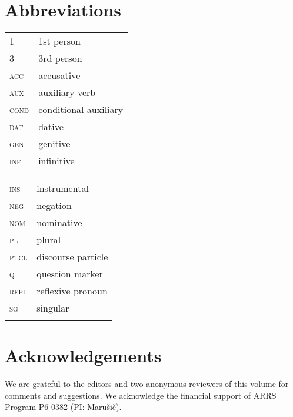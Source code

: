 \documentclass[output=paper,
modfonts,
newtxmath,
hidelinks
]{langscibook}
\begin{document}
\section*{Abbreviations}
\begin{tabularx}{.5\textwidth}{@{}lQ@{}}
\textsc{1}&1st person\\
\textsc{3}&3rd person\\
\textsc{acc}&accusative\\
\textsc{aux}&auxiliary verb\\
\textsc{cond}&conditional auxiliary\\
\textsc{dat}&dative\\
\textsc{gen}&genitive\\
\textsc{inf}&infinitive\\
\end{tabularx}%
\begin{tabularx}{.5\textwidth}{@{}lQ@{}}
\textsc{ins}&instrumental\\
\textsc{neg}&negation\\
\textsc{nom}&nominative\\
\textsc{pl}&plural\\
\textsc{ptcl}&discourse particle\\
\textsc{q}&question marker\\
\textsc{refl}&reflexive pronoun\\
\textsc{sg}&singular\\
&\\
\end{tabularx}


\section*{Acknowledgements}
We are grateful to the editors and two anonymous reviewers of this volume for comments and suggestions. We acknowledge the financial support of ARRS Program P6-0382 (PI: Marušič).

\sloppy
\printbibliography[heading=subbibliography,notkeyword=this]
\end{document}
